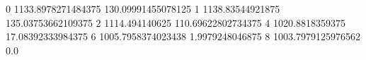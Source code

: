 0 1133.8978271484375 130.09991455078125
1 1138.83544921875 135.03753662109375
2 1114.494140625 110.69622802734375
4 1020.8818359375 17.08392333984375
6 1005.7958374023438 1.9979248046875
8 1003.7979125976562 0.0
